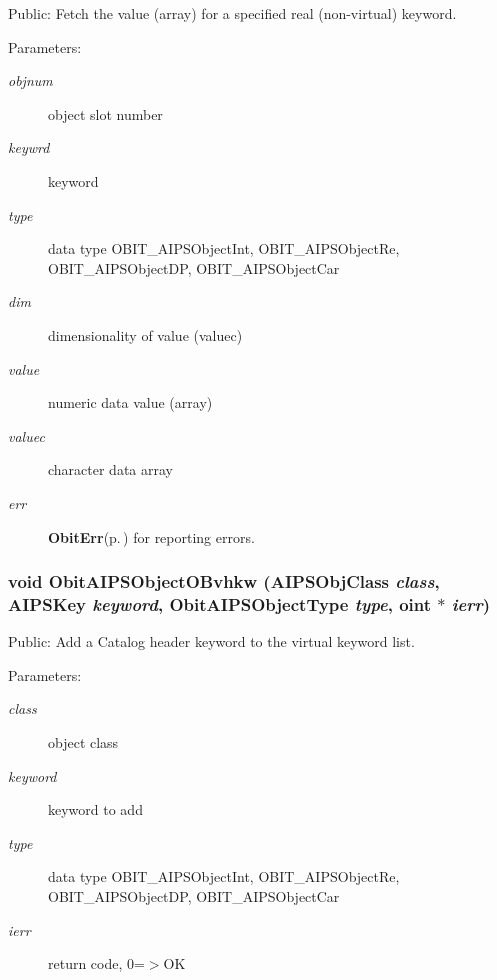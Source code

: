 Public: Fetch the value (array) for a specified real (non-virtual) keyword. 

\begin{Desc}
\item[Parameters:]
\begin{description}
\item[{\em objnum}]object slot number \item[{\em keywrd}]keyword \item[{\em type}]data type OBIT\_\-AIPSObject\-Int, OBIT\_\-AIPSObject\-Re, OBIT\_\-AIPSObject\-DP, OBIT\_\-AIPSObject\-Car \item[{\em dim}]dimensionality of value (valuec) \item[{\em value}]numeric data value (array) \item[{\em valuec}]character data array \item[{\em err}]{\bf Obit\-Err}{\rm (p.\,\pageref{structObitErr})} for reporting errors. \end{description}
\end{Desc}
\subsubsection{\setlength{\rightskip}{0pt plus 5cm}void Obit\-AIPSObject\-OBvhkw ({\bf AIPSObj\-Class} {\em class}, {\bf AIPSKey} {\em keyword}, Obit\-AIPSObject\-Type {\em type}, {\bf oint} $\ast$ {\em ierr})}\label{ObitAIPSObject_8c_a23}


Public: Add a Catalog header keyword to the virtual keyword list. 

\begin{Desc}
\item[Parameters:]
\begin{description}
\item[{\em class}]object class \item[{\em keyword}]keyword to add \item[{\em type}]data type OBIT\_\-AIPSObject\-Int, OBIT\_\-AIPSObject\-Re, OBIT\_\-AIPSObject\-DP, OBIT\_\-AIPSObject\-Car \item[{\em ierr}]return code, 0=$>$OK \end{description}
\end{Desc}
